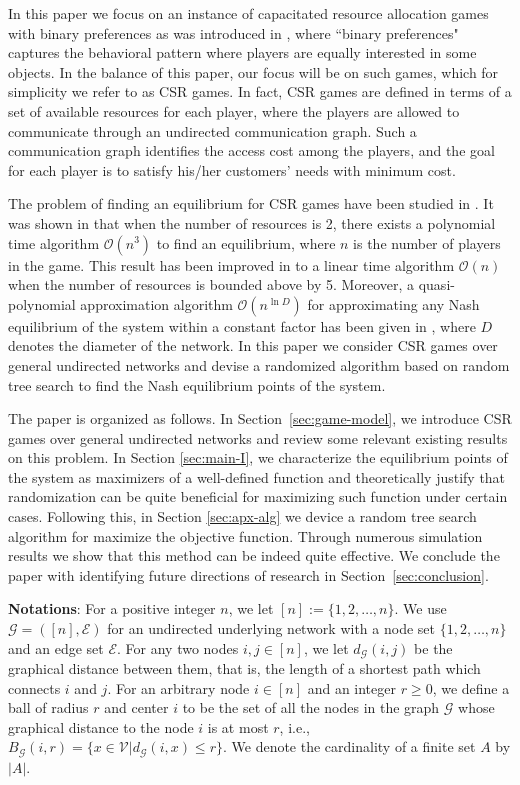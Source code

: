 In this paper we focus on an instance of capacitated resource allocation games with binary preferences as was introduced in \cite{gopalakrishnan2012cache}, where ``binary preferences" captures the behavioral pattern where players are equally interested in some objects. In the balance of this paper, our focus will be on such games, which for simplicity we refer to as CSR games. In fact, CSR games are defined in terms of a set of available resources for each player, where the players are allowed to communicate through an undirected communication graph. Such a communication graph identifies the access cost among the players, and the goal for each player is to satisfy his/her customers' needs with minimum cost. 

The problem of finding an equilibrium for CSR games have been studied in \cite{gopalakrishnan2012cache,etesami2014pure}. It was shown in \cite{gopalakrishnan2012cache} that when the number of resources is 2, there exists a polynomial time algorithm $\mathcal{O}(n^3)$ to find an equilibrium, where $n$ is the number of players in the game. This result has been improved in \cite{etesami2014pure} to a linear time algorithm $\mathcal{O}(n)$ when the number of resources is bounded above by 5. Moreover, a quasi-polynomial approximation algorithm $\mathcal{O}(n^{\ln D})$ for approximating any Nash equilibrium of the system within a constant factor has been given in \cite{etesami2015approximation}, where $D$ denotes the diameter of the network. In this paper we consider CSR games over general undirected networks and devise a randomized algorithm based on random tree search to find the Nash equilibrium points of the system.
 
The paper is organized as follows. In Section~\ref{sec:game-model}, we introduce CSR games over general undirected networks and review some relevant existing results on this problem. In Section \ref{sec:main-I}, we  characterize the equilibrium points of the system as maximizers of a well-defined function and theoretically justify that randomization can be quite beneficial for maximizing such function under certain cases. Following this, in Section \ref{sec:apx-alg} we device a random tree search algorithm for maximize the objective function. Through numerous simulation results we show that this method can be indeed quite effective. We conclude the paper with identifying future directions of research in Section~\ref{sec:conclusion}. 

\textbf{Notations}: 
For a positive integer $n$, we let $[n]:=\{1,2,\ldots,n\}$. We use $\mathcal{G}=([n], \mathcal{E})$ for an undirected underlying network with a node set $\{1,2,\ldots,n\}$ and an edge set $\mathcal{E}$. For any two nodes $i, j \in [n]$, we let $d_{\mathcal{G}}(i,j)$ be the graphical distance between them, that is, the length of a shortest path which connects $i$ and $j$. For an arbitrary node $i\in [n]$ and an integer $r\ge 0$, we define a ball of radius $r$ and center $i$ to be the set of all the nodes in the graph $\mathcal{G}$ whose graphical distance to the node $i$ is at most $r$, i.e., $B_{\mathcal{G}}(i,r)=\{x\in \mathcal{V}| d_{\mathcal{G}}(i,x)\leq r\}$. We denote the cardinality of a finite set $A$ by $|A|$.
